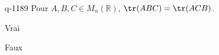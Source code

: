 \begin{truefalse}{q-1189}
Pour $A,B,C\in M_n(\mathbb{R})$, $\tr(ABC)=\tr(ACB)$.
\item Vrai
\item* Faux
\end{truefalse}

